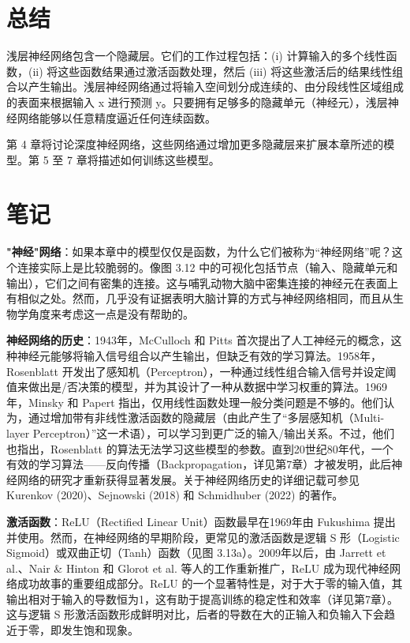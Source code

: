 \section{总结}
浅层神经网络包含一个隐藏层。它们的工作过程包括：(i) 计算输入的多个线性函数，(ii) 将这些函数结果通过激活函数处理，然后 (iii) 将这些激活后的结果线性组合以产生输出。浅层神经网络通过将输入空间划分成连续的、由分段线性区域组成的表面来根据输入 x 进行预测 y。只要拥有足够多的隐藏单元（神经元），浅层神经网络能够以任意精度逼近任何连续函数。

第 4 章将讨论深度神经网络，这些网络通过增加更多隐藏层来扩展本章所述的模型。第 5 至 7 章将描述如何训练这些模型。

\section{笔记}

\textbf{"神经"网络}：如果本章中的模型仅仅是函数，为什么它们被称为“神经网络”呢？这个连接实际上是比较脆弱的。像图 3.12 中的可视化包括节点（输入、隐藏单元和输出），它们之间有密集的连接。这与哺乳动物大脑中密集连接的神经元在表面上有相似之处。然而，几乎没有证据表明大脑计算的方式与神经网络相同，而且从生物学角度来考虑这一点是没有帮助的。

\textbf{神经网络的历史}：1943年，McCulloch 和 Pitts 首次提出了人工神经元的概念，这种神经元能够将输入信号组合以产生输出，但缺乏有效的学习算法。1958年，Rosenblatt 开发出了感知机（Perceptron），一种通过线性组合输入信号并设定阈值来做出是/否决策的模型，并为其设计了一种从数据中学习权重的算法。1969年，Minsky 和 Papert 指出，仅用线性函数处理一般分类问题是不够的。他们认为，通过增加带有非线性激活函数的隐藏层（由此产生了“多层感知机（Multi-layer Perceptron）”这一术语），可以学习到更广泛的输入/输出关系。不过，他们也指出，Rosenblatt 的算法无法学习这些模型的参数。直到20世纪80年代，一个有效的学习算法——反向传播（Backpropagation，详见第7章）才被发明，此后神经网络的研究才重新获得显著发展。关于神经网络历史的详细记载可参见 Kurenkov (2020)、Sejnowski (2018) 和 Schmidhuber (2022) 的著作。

\textbf{激活函数}：ReLU（Rectified Linear Unit）函数最早在1969年由 Fukushima 提出并使用。然而，在神经网络的早期阶段，更常见的激活函数是逻辑 S 形（Logistic Sigmoid）或双曲正切（Tanh）函数（见图 3.13a）。2009年以后，由 Jarrett et al.、Nair \& Hinton 和 Glorot et al. 等人的工作重新推广，ReLU 成为现代神经网络成功故事的重要组成部分。ReLU 的一个显著特性是，对于大于零的输入值，其输出相对于输入的导数恒为1，这有助于提高训练的稳定性和效率（详见第7章）。这与逻辑 S 形激活函数形成鲜明对比，后者的导数在大的正输入和负输入下会趋近于零，即发生饱和现象。

